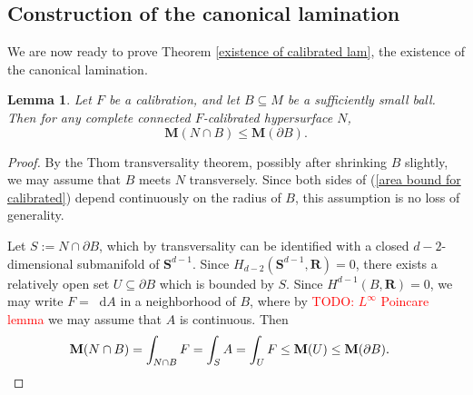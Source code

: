 \documentclass[reqno,11pt]{amsart}
\newcommand{\RR}{\mathbf{R}}
\newcommand{\Sph}{\mathbf S}
\newcommand*\dif{\mathop{}\!\mathrm{d}}
\newcommand{\Mass}{\mathbf M}
\newtheorem{lemma}[theorem]{Lemma}
\theoremstyle{definition}
\numberwithin{equation}{section}
\newcommand\todo[1]{\textcolor{red}{TODO: #1}}
\begin{document}
\subsection{Construction of the canonical lamination}
We are now ready to prove Theorem \ref{existence of calibrated lam}, the existence of the canonical lamination.

\begin{lemma}
Let $F$ be a calibration, and let $B \subseteq M$ be a sufficiently small ball.
Then for any complete connected $F$-calibrated hypersurface $N$, 
\begin{equation}\label{area bound for calibrated}
\Mass(N \cap B) \leq \Mass(\partial B).
\end{equation}
\end{lemma}
\begin{proof}
By the Thom transversality theorem, possibly after shrinking $B$ slightly, we may assume that $B$ meets $N$ transversely.
Since both sides of (\ref{area bound for calibrated}) depend continuously on the radius of $B$, this assumption is no loss of generality.

Let $S := N \cap \partial B$, which by transversality can be identified with a closed $d - 2$-dimensional submanifold of $\Sph^{d - 1}$.
Since $H_{d - 2}(\Sph^{d - 1}, \RR) = 0$, there exists a relatively open set $U \subseteq \partial B$ which is bounded by $S$.
Since $H^{d - 1}(B, \RR) = 0$, we may write $F = \dif A$ in a neighborhood of $B$, where by \todo{$L^\infty$ Poincare lemma} we may assume that $A$ is continuous.
Then
\begin{align*}
\Mass(N \cap B) &= \int_{N \cap B} F = \int_S A = \int_U F \leq \Mass(U) \leq \Mass(\partial B). \qedhere
\end{align*}
\end{proof}
\end{document}
